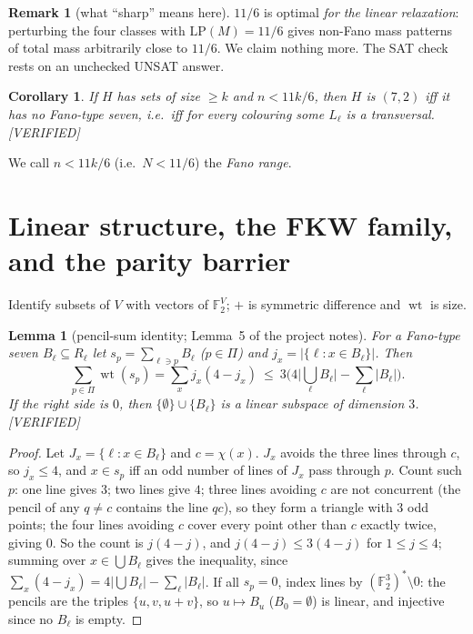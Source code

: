 \documentclass[11pt]{article}
\newtheorem{lemma}[theorem]{Lemma}
\newtheorem{corollary}[theorem]{Corollary}
\theoremstyle{definition}
\newtheorem{remark}[theorem]{Remark}
\newcommand{\st}[1]{\textsf{\small[#1]}}
\newcommand{\F}{\mathbb{F}_2}
\newcommand{\wt}{\operatorname{wt}}
\begin{document}
\begin{remark}[what ``sharp'' means here]
$11/6$ is optimal \emph{for the linear relaxation}: perturbing the four classes with $\mathrm{LP}(M)=11/6$ gives
non-Fano mass patterns of total mass arbitrarily close to $11/6$. We claim nothing more. The SAT check rests on an
unchecked UNSAT answer.
\end{remark}

\begin{corollary}\label{cor:fanorange}
If $H$ has sets of size $\ge k$ and $n<11k/6$, then $H$ is $(7,2)$ iff it has no Fano-type seven, i.e.\ iff for every
colouring some $L_\ell$ is a transversal. \st{VERIFIED}
\end{corollary}
We call $n<11k/6$ (i.e.\ $N<11/6$) the \emph{Fano range}.

\section{Linear structure, the FKW family, and the parity barrier}\label{sec:linear}

Identify subsets of $V$ with vectors of $\F^V$; $+$ is symmetric difference and $\wt$ is size.

\begin{lemma}[pencil-sum identity; Lemma~5 of the project notes]\label{lem:pencil}
For a Fano-type seven $B_\ell\subseteq R_\ell$ let $s_p=\sum_{\ell\ni p}B_\ell$ ($p\in\Pi$) and
$j_x=|\{\ell:x\in B_\ell\}|$. Then
\[
\sum_{p\in\Pi}\wt(s_p)=\sum_{x}j_x(4-j_x)\ \le\ 3\Big(4\big|\textstyle\bigcup_\ell B_\ell\big|-\sum_\ell|B_\ell|\Big).
\]
If the right side is $0$, then $\{\emptyset\}\cup\{B_\ell\}$ is a linear subspace of dimension $3$. \st{VERIFIED}
\end{lemma}
\begin{proof}
Let $J_x=\{\ell:x\in B_\ell\}$ and $c=\chi(x)$. $J_x$ avoids the three lines through $c$, so $j_x\le4$, and $x\in s_p$
iff an odd number of lines of $J_x$ pass through $p$. Count such $p$: one line gives $3$; two lines give $4$; three
lines avoiding $c$ are not concurrent (the pencil of any $q\ne c$ contains the line $qc$), so they form a triangle with
$3$ odd points; the four lines avoiding $c$ cover every point other than $c$ exactly twice, giving $0$. So the count is
$j(4-j)$, and $j(4-j)\le3(4-j)$ for $1\le j\le4$; summing over $x\in\bigcup B_\ell$ gives the inequality, since
$\sum_x(4-j_x)=4|\bigcup B_\ell|-\sum_\ell|B_\ell|$. If all $s_p=0$, index lines by $(\F^3)^*\setminus0$: the pencils
are the triples $\{u,v,u+v\}$, so $u\mapsto B_u$ ($B_0=\emptyset$) is linear, and injective since no $B_\ell$ is empty.
\end{proof}
\end{document}
